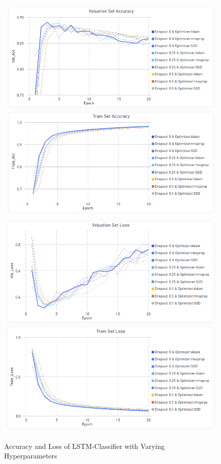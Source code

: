 \documentclass[11pt, a4paper]{article}
\begin{document}
\begin{figure}
    \centering
    \includegraphics[scale=0.55]{LSTM_Accuracy.png}
    \includegraphics[scale=0.55]{LSTM_Loss.png}
    \caption{Accuracy and Loss of LSTM-Classifier with Varying Hyperparameters}
    \label{fig:lstm_acc_loss}
\end{figure}
\end{document}
